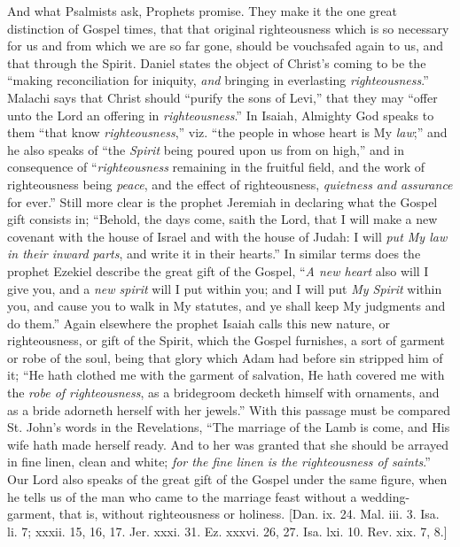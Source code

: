 And what Psalmists ask, Prophets promise. They make it the one
great distinction of Gospel times, that that original righteousness
which is so necessary for us and from which we are so far gone, should
be vouchsafed again to us, and that through the Spirit. Daniel states
the object of Christ's coming to be the ``making reconciliation
for iniquity, \emph{and} bringing in everlasting \emph{righteousness}.''
Malachi says that Christ should ``purify the sons of Levi,''
that they may ``offer unto the Lord an offering in \emph{righteousness}.''
In Isaiah, Almighty God speaks to them ``that know \emph{righteousness},''
viz. ``the people in whose heart is My \emph{law};'' and he
also speaks of ``the \emph{Spirit} being poured upon us from on
high,'' and in consequence of ``\emph{righteousness} remaining
in the fruitful field, and the work of righteousness being \emph{peace},
and the effect of righteousness, \emph{quietness and assurance} for
ever.'' Still more clear is the prophet Jeremiah in declaring what
the Gospel gift consists in; ``Behold, the days come, saith the
Lord, that I will make a new covenant with the house of Israel and
with the house of Judah: I will \emph{put My law in their inward parts},
and write it in their hearts.'' In similar terms does the prophet
Ezekiel describe the great gift of the Gospel, ``\emph{A new heart}
also will I give you, and a \emph{new spirit} will I put within you;
and I will put \emph{My Spirit} within you, and cause you to walk in
My statutes, and ye shall keep My judgments and do them.'' Again
elsewhere the prophet Isaiah calls this new nature, or righteousness,
or gift of the Spirit, which the Gospel furnishes, a sort of garment
or robe of the soul, being that glory which Adam had before sin
stripped him of it; ``He hath clothed me with the garment of
salvation, He hath covered me with the \emph{robe of righteousness},
as a bridegroom decketh himself with ornaments, and as a bride
adorneth herself with her jewels.'' With this passage must be
compared St. John's words in the Revelations, ``The marriage of
the Lamb is come, and His wife hath made herself ready. And to her was
granted that she should be arrayed in fine linen, clean and white; \emph{for
the fine linen is the righteousness of saints}.'' Our Lord also
speaks of the great gift of the Gospel under the same figure, when he
tells us of the man who came to the marriage feast without a
wedding-garment, that is, without righteousness or holiness. [Dan. ix.
24. Mal. iii. 3. Isa. li. 7; xxxii. 15, 16, 17. Jer. xxxi. 31. Ez.
xxxvi. 26, 27. Isa. lxi. 10. Rev. xix. 7, 8.]


